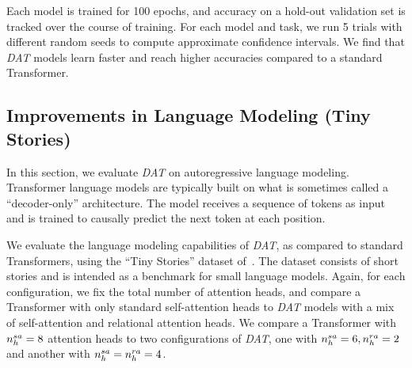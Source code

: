 Each model is trained for 100 epochs, and accuracy on a hold-out validation set is tracked over the course of training. For each model and task, we run 5 trials with different random seeds to compute approximate confidence intervals. We find that \textit{DAT} models learn faster and reach higher accuracies compared to a standard Transformer.

\subsection{Improvements in Language Modeling (Tiny Stories)}\label{ssec:tiny_stories}

In this section, we evaluate \textit{DAT} on autoregressive language modeling. Transformer language models are typically built on what is sometimes called a ``decoder-only'' architecture. The model receives a sequence of tokens as input and is trained to causally predict the next token at each position.

We evaluate the language modeling capabilities of \textit{DAT}, as compared to standard Transformers, using the ``Tiny Stories'' dataset of~\citet{eldanTinyStoriesHowSmall2023}. The dataset consists of short stories and is intended as a benchmark for small language models. Again, for each configuration, we fix the total number of attention heads, and compare a Transformer with only standard self-attention heads to \textit{DAT} models with a mix of self-attention and relational attention heads. We compare a Transformer with $n_h^{sa} = 8$ attention heads to two configurations of \textit{DAT}, one with $n_h^{sa} = 6, n_h^{ra} = 2$ and another with $n_h^{sa} = n_h^{ra} = 4$.

